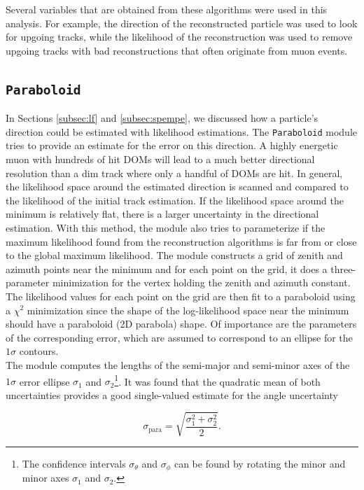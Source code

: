 \noindent Several variables that are obtained from these algorithms were used in this analysis. For example, the direction of the reconstructed particle was used to look for upgoing tracks, while the likelihood of the reconstruction was used to remove upgoing tracks with bad reconstructions that often originate from muon events.

\subsection{\texttt{Paraboloid}}
\label{subsec:paraboloid}

In Sections \ref{subsec:lf} and \ref{subsec:spempe}, we discussed how a particle's direction could be estimated with likelihood estimations. The \texttt{Paraboloid} module tries to provide an estimate for the error on this direction. A highly energetic muon with hundreds of hit DOMs will lead to a much better directional resolution than a dim track where only a handful of DOMs are hit. In general, the likelihood space around the estimated direction is scanned and compared to the likelihood of the initial track estimation. If the likelihood space around the minimum is relatively flat, there is a larger uncertainty in the directional estimation. With this method, the module also tries to parameterize if the maximum likelihood found from the reconstruction algorithms is far from or close to the global maximum likelihood. The module constructs a grid of zenith and azimuth points near the minimum and for each point on the grid, it does a three-parameter minimization for the vertex holding the zenith and azimuth constant. The likelihood values for each point on the grid are then fit to a paraboloid using a $\chi^2$ minimization since the shape of the log-likelihood space near the minimum should have a paraboloid (2D parabola) shape. Of importance are the parameters of the corresponding error, which are assumed to correspond to an ellipse for the $1\sigma$ contours.\\

\noindent The module computes the lengths of the semi-major and semi-minor axes of the $1\sigma$ error ellipse $\sigma_1$ and $\sigma_2$\footnote{The confidence intervals $\sigma_\theta$ and $\sigma_\phi$ can be found by rotating the minor and minor axes $\sigma_1$ and $\sigma_2$.}. It was found that the quadratic mean of both uncertainties provides a good single-valued estimate for the angle uncertainty

\begin{equation}
\label{eq:paraboloid}
\sigma_\textrm{para} = \sqrt{\frac{\sigma_1^2 + \sigma_2^2}{2}}.
\end{equation}

